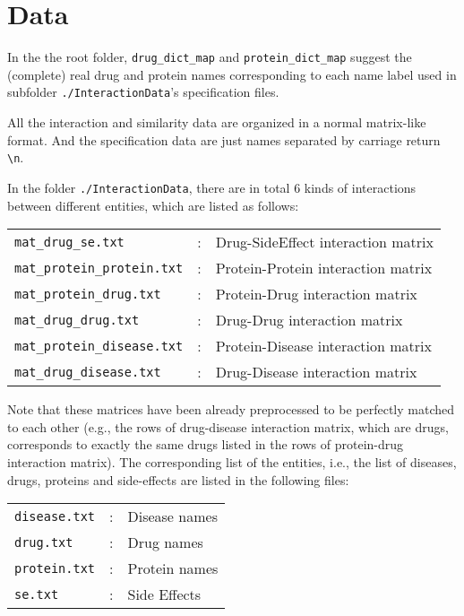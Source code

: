 \documentclass[12pt]{article}
\begin{document}
\section{Data}
In the the root folder,  \verb+drug_dict_map+ and
\verb+protein_dict_map+ suggest the (complete) real drug and
protein names corresponding to each name label used in subfolder
\verb+./InteractionData+'s specification files.

All the interaction and similarity data are organized in a normal
matrix-like format. And the specification data are just names
separated by carriage return \verb/\n/.

In the folder \verb+./InteractionData+, there are in total 6 kinds
of interactions between different entities, which are listed as
follows:

\begin{table}[htpb]
  \centering
  \begin{tabular}{lll}
    \verb/mat_drug_se.txt/ &:&Drug-SideEffect interaction matrix\\
    \verb/mat_protein_protein.txt/ &: &Protein-Protein interaction matrix\\
    \verb/mat_protein_drug.txt/ &: &Protein-Drug interaction matrix\\
    \verb/mat_drug_drug.txt/ &: &Drug-Drug interaction matrix\\
    \verb/mat_protein_disease.txt/ &:       &Protein-Disease interaction matrix\\
    \verb/mat_drug_disease.txt/ &:      &Drug-Disease interaction matrix
  \end{tabular}
\end{table}

Note that these matrices have been already preprocessed to be
perfectly matched to each other (e.g., the rows of drug-disease
interaction matrix, which are drugs, corresponds to exactly the
same drugs listed in the rows of protein-drug interaction matrix).
The corresponding list of the entities, i.e., the list of
diseases, drugs, proteins and side-effects are listed in the
following files:

\begin{table}[htpb]
  \centering
  \begin{tabular}{lll}
    \verb/disease.txt/ &: &Disease names\\
    \verb/drug.txt/ &: &Drug names\\
    \verb/protein.txt/ &: &Protein names\\
    \verb/se.txt/ &: &Side Effects
\end{tabular}
\end{table}
\end{document}
